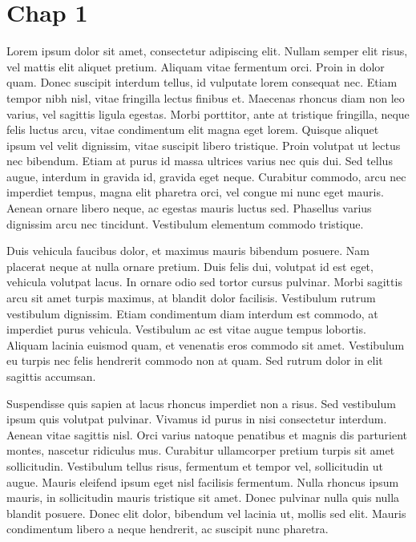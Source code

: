 \section{Chap 1}

Lorem ipsum dolor sit amet, consectetur adipiscing elit. Nullam semper elit risus, vel mattis elit aliquet pretium. Aliquam vitae fermentum orci. Proin in dolor quam. Donec suscipit interdum tellus, id vulputate lorem consequat nec. Etiam tempor nibh nisl, vitae fringilla lectus finibus et. Maecenas rhoncus diam non leo varius, vel sagittis ligula egestas. Morbi porttitor, ante at tristique fringilla, neque felis luctus arcu, vitae condimentum elit magna eget lorem. Quisque aliquet ipsum vel velit dignissim, vitae suscipit libero tristique. Proin volutpat ut lectus nec bibendum. Etiam at purus id massa ultrices varius nec quis dui. Sed tellus augue, interdum in gravida id, gravida eget neque. Curabitur commodo, arcu nec imperdiet tempus, magna elit pharetra orci, vel congue mi nunc eget mauris. Aenean ornare libero neque, ac egestas mauris luctus sed. Phasellus varius dignissim arcu nec tincidunt. Vestibulum elementum commodo tristique.

Duis vehicula faucibus dolor, et maximus mauris bibendum posuere. Nam placerat neque at nulla ornare pretium. Duis felis dui, volutpat id est eget, vehicula volutpat lacus. In ornare odio sed tortor cursus pulvinar. Morbi sagittis arcu sit amet turpis maximus, at blandit dolor facilisis. Vestibulum rutrum vestibulum dignissim. Etiam condimentum diam interdum est commodo, at imperdiet purus vehicula. Vestibulum ac est vitae augue tempus lobortis. Aliquam lacinia euismod quam, et venenatis eros commodo sit amet. Vestibulum eu turpis nec felis hendrerit commodo non at quam. Sed rutrum dolor in elit sagittis accumsan.

Suspendisse quis sapien at lacus rhoncus imperdiet non a risus. Sed vestibulum ipsum quis volutpat pulvinar. Vivamus id purus in nisi consectetur interdum. Aenean vitae sagittis nisl. Orci varius natoque penatibus et magnis dis parturient montes, nascetur ridiculus mus. Curabitur ullamcorper pretium turpis sit amet sollicitudin. Vestibulum tellus risus, fermentum et tempor vel, sollicitudin ut augue. Mauris eleifend ipsum eget nisl facilisis fermentum. Nulla rhoncus ipsum mauris, in sollicitudin mauris tristique sit amet. Donec pulvinar nulla quis nulla blandit posuere. Donec elit dolor, bibendum vel lacinia ut, mollis sed elit. Mauris condimentum libero a neque hendrerit, ac suscipit nunc pharetra.

